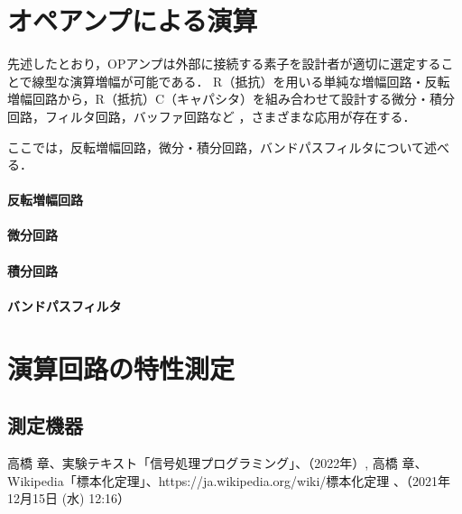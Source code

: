 \documentclass[dvipdfmx,titlepage,a4j]{jsarticle}  %
\begin{document}
\section{オペアンプによる演算}
先述したとおり，OPアンプは外部に接続する素子を設計者が適切に選定することで線型な演算増幅が可能である．
R（抵抗）を用いる単純な増幅回路・反転増幅回路から，R（抵抗）C（キャパシタ）を組み合わせて設計する微分・積分回路，フィルタ回路，バッファ回路など
，さまざまな応用が存在する．

ここでは，反転増幅回路，微分・積分回路，バンドパスフィルタについて述べる．

\paragraph{反転増幅回路\\}

\paragraph{微分回路\\}

\paragraph{積分回路\\}

\paragraph{バンドパスフィルタ\\}

\section{演算回路の特性測定}
\subsection{測定機器}

\begin{thebibliography}{99}
   高橋 章、実験テキスト「信号処理プログラミング」、（2022年）,
   高橋 章、Wikipedia「標本化定理」、{https://ja.wikipedia.org/wiki/標本化定理} 、（2021年12月15日 (水) 12:16）
\end{thebibliography}
\end{document}
